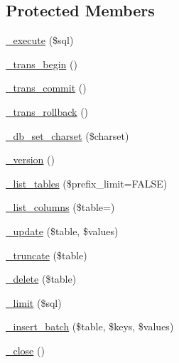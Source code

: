 \subsection*{Protected Members}
\begin{DoxyCompactItemize}
\item 
\mbox{\hyperlink{class_c_i___d_b__mssql__driver_a114ab675d89bf8324a41785fb475e86d}{\+\_\+execute}} (\$sql)
\item 
\mbox{\hyperlink{class_c_i___d_b__mssql__driver_ac81ac882c1d54347d810199a15856aac}{\+\_\+trans\+\_\+begin}} ()
\item 
\mbox{\hyperlink{class_c_i___d_b__mssql__driver_a6fe7f373e0b11cfae23a5f41c0b35dda}{\+\_\+trans\+\_\+commit}} ()
\item 
\mbox{\hyperlink{class_c_i___d_b__mssql__driver_ad49a116b0776c26b53114c9093fd102a}{\+\_\+trans\+\_\+rollback}} ()
\item 
\mbox{\hyperlink{class_c_i___d_b__mssql__driver_a2b808d420d8e9fea0b73ad7127f5efb8}{\+\_\+db\+\_\+set\+\_\+charset}} (\$charset)
\item 
\mbox{\hyperlink{class_c_i___d_b__mssql__driver_ac997a462bb342f97f414910f0e033fb6}{\+\_\+version}} ()
\item 
\mbox{\hyperlink{class_c_i___d_b__mssql__driver_a435c0f3ce54fe7daa178baa8532ebd54}{\+\_\+list\+\_\+tables}} (\$prefix\+\_\+limit=F\+A\+L\+SE)
\item 
\mbox{\hyperlink{class_c_i___d_b__mssql__driver_a7ccb7f9c301fe7f0a9db701254142b63}{\+\_\+list\+\_\+columns}} (\$table=\textquotesingle{}\textquotesingle{})
\item 
\mbox{\hyperlink{class_c_i___d_b__mssql__driver_a2540b03a93fa73ae74c10d0e16fc073e}{\+\_\+update}} (\$table, \$values)
\item 
\mbox{\hyperlink{class_c_i___d_b__mssql__driver_aa029600528fc1ce660a23ff4b4667f95}{\+\_\+truncate}} (\$table)
\item 
\mbox{\hyperlink{class_c_i___d_b__mssql__driver_a133ea8446ded52589bd22cc9163d0896}{\+\_\+delete}} (\$table)
\item 
\mbox{\hyperlink{class_c_i___d_b__mssql__driver_a3a02ea06541b8ecc25a33a61651562c8}{\+\_\+limit}} (\$sql)
\item 
\mbox{\hyperlink{class_c_i___d_b__mssql__driver_a1978e1358c812587a46e242630365099}{\+\_\+insert\+\_\+batch}} (\$table, \$keys, \$values)
\item 
\mbox{\hyperlink{class_c_i___d_b__mssql__driver_a4d9082658000e5ede8312067c6dda9db}{\+\_\+close}} ()
\end{DoxyCompactItemize}
